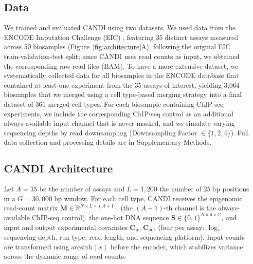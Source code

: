 \label{methods}
\subsection{Data}

We trained and evaluated CANDI using two datasets. We used data from the ENCODE Imputation Challenge (EIC) \cite{schreiber2023encode}, featuring 35 distinct assays measured across 50 biosamples (Figure~\ref{fig:architecture}A), following the original EIC train-validation-test split; since CANDI uses read counts as input, we obtained the corresponding raw read files (BAM). To have a more extensive dataset, we systematically collected data for all biosamples in the ENCODE database that contained at least one experiment from the 35 assays of interest, yielding 3,064 biosamples that we merged using a cell type-based merging strategy into a final dataset of 361 merged cell types. For each biosample containing ChIP-seq experiments, we include the corresponding ChIP-seq control as an additional always-available input channel that is never masked, and we simulate varying sequencing depths by read downsampling (Downsampling Factor $\in \{1, 2, 4\}$). Full data collection and processing details are in Supplementary Methods.

\subsection{CANDI Architecture}

Let $A = 35$ be the number of assays and $L = 1{,}200$ the number of 25 bp positions in a $G = 30{,}000$ bp window. For each cell type, CANDI receives the epigenomic read-count matrix $\mathbf{M} \in \mathbb{R}^{N \times L \times (A+1)}$ (the $(A{+}1)$-th channel is the always-available ChIP-seq control), the one-hot DNA sequence $\mathbf{S} \in \{0,1\}^{N \times 4 \times G}$, and input and output experimental covariates $\mathbf{C}_{\text{in}}, \mathbf{C}_{\text{out}}$ (four per assay: $\log_2$ sequencing depth, run type, read length, and sequencing platform). Input counts are transformed using $\text{arcsinh}(x)$ before the encoder, which stabilizes variance across the dynamic range of read counts.

